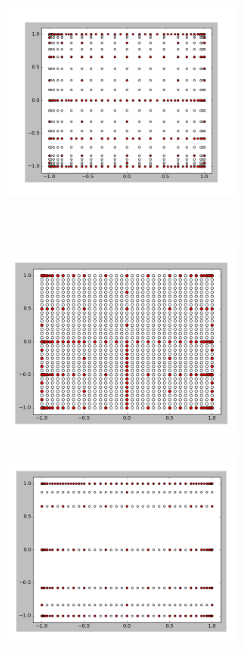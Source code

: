 \begin{center}
\begin{figure}[!h]
    \centering
    \begin{subfigure}[b]{0.45\textwidth}
				\includegraphics[width=\linewidth,height=5cm]{images/0.png}
    \end{subfigure}
		~
    \begin{subfigure}[b]{0.45\textwidth}
        \includegraphics[width=\linewidth,height=5cm]{images/2.png}
    \end{subfigure}
		\begin{subfigure}[b]{0.45\textwidth}
				\includegraphics[width=\linewidth,height=5cm]{images/mixed.png}
		\end{subfigure}
\end{figure}
\label{figure:interpmethods}
\end{center}


